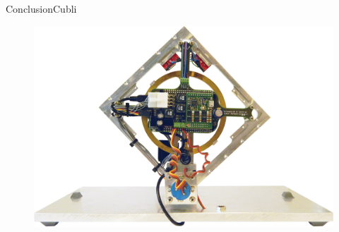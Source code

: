 \begin{frame}{Conclusion}{Cubli}
\begin{figure}
	\centering
	\includegraphics[scale=0.9]{Pictures/Cubli-1}
\end{figure}
%

%	
\end{frame}
%
